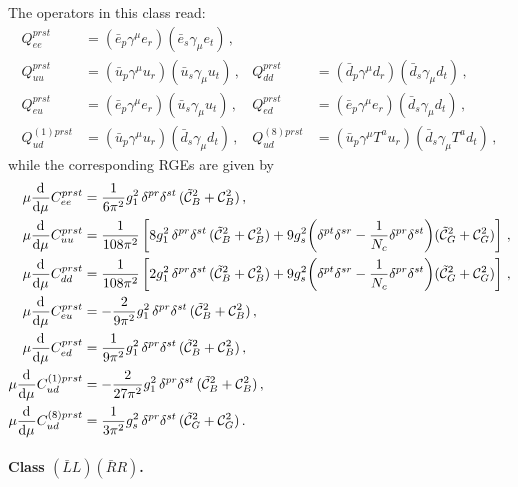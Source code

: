 The operators in this class read:
\begin{align}
Q_{ee}^{prst} &= (\bar{e}_p \gamma^\mu e_r)(\bar{e}_s \gamma_\mu e_t)\,, && \\ Q_{uu}^{prst} &= (\bar{u}_p \gamma^\mu u_r)(\bar{u}_s \gamma_\mu u_t)\,, & Q_{dd}^{prst} &= (\bar{d}_p \gamma^\mu d_r)(\bar{d}_s \gamma_\mu d_t)\,, \\
Q_{eu}^{prst} &= (\bar{e}_p \gamma^\mu e_r)(\bar{u}_s \gamma_\mu u_t)\,, & Q_{ed}^{prst} &= (\bar{e}_p \gamma^\mu e_r)(\bar{d}_s \gamma_\mu d_t)\,,\\
Q_{ud}^{(1)prst} &= (\bar{u}_p \gamma^\mu u_r)(\bar{d}_s \gamma_\mu d_t)\,, & Q_{ud}^{(8)prst} &= (\bar{u}_p \gamma^\mu T^a u_r)(\bar{d}_s \gamma_\mu T^a d_t)\,,
\end{align}
while the corresponding RGEs are given by
\begin{align}
    \mu \dv[]{}{\mu}{C}_{ee}^{prst} &=\frac{1}{6\pi^2}  g_1^2\, \delta^{pr}\delta^{st}\,(\tilde{\mathcal{C}}_{B}^2 + \mathcal{C}_{B}^2)\, , \\
    \mu \dv[]{}{\mu}{C}_{uu}^{prst} &=\frac{1}{108\pi^2}\left[  8g_1^2\, \delta^{pr}\delta^{st}\,(\tilde{\mathcal{C}}_{B}^2 + \mathcal{C}_{B}^2) +9g_s^2\bigg(\delta^{pt}\delta^{sr}-\frac{1}{N_c} \delta^{pr}\delta^{st}\bigg)(\tilde{\mathcal{C}}_{G}^2 + \mathcal{C}_{G}^2)\right]\, , \\
    \mu \dv[]{}{\mu}{C}_{dd}^{prst} &=\frac{1}{108\pi^2}\left[  2g_1^2\, \delta^{pr}\delta^{st}\,(\tilde{\mathcal{C}}_{B}^2 + \mathcal{C}_{B}^2) +9g_s^2\bigg(\delta^{pt}\delta^{sr}-\frac{1}{N_c} \delta^{pr}\delta^{st}\bigg)(\tilde{\mathcal{C}}_{G}^2 + \mathcal{C}_{G}^2)\right]\, , \\
    \mu \dv[]{}{\mu}{C}_{eu}^{prst} &=  -\frac{2}{9\pi^2}g_1^2\, \delta^{pr}\delta^{st}\,(\tilde{\mathcal{C}}_{B}^2 + \mathcal{C}_{B}^2)\, , \\
    \mu \dv[]{}{\mu}{C}_{ed}^{prst} &=  \frac{1}{9\pi^2}g_1^2\, \delta^{pr}\delta^{st}\,(\tilde{\mathcal{C}}_{B}^2 + \mathcal{C}_{B}^2)\, , \\
    \mu \dv[]{}{\mu}{C}_{ud}^{(1)prst} &=  -\frac{2}{27\pi^2}g_1^2\, \delta^{pr}\delta^{st}\,(\tilde{\mathcal{C}}_{B}^2 + \mathcal{C}_{B}^2)\, , \\ 
    \mu \dv[]{}{\mu}{C}_{ud}^{(8)prst} &=  \frac{1}{3\pi^2}g_s^2\,\delta^{pr}\delta^{st}\,(\tilde{\mathcal{C}}_{G}^2 + \mathcal{C}_{G}^2) \,.
\end{align}
%

\paragraph{Class $(\bar{L}L)(\bar{R}R)$.}

